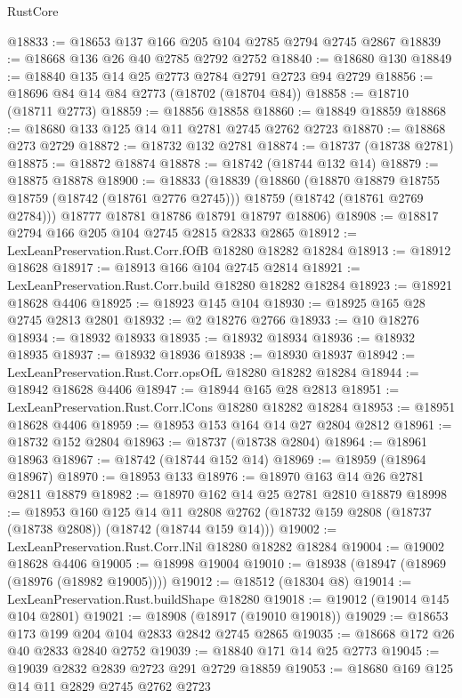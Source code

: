 \begin{lexlean}{RustCore}
\begin{coremodule}
@18833 := @18653 @137 @166 @205 @104 @2785 @2794 @2745 @2867
@18839 := @18668 @136 @26 @40 @2785 @2792 @2752
@18840 := @18680 @130
@18849 := @18840 @135 @14 @25 @2773 @2784 @2791 @2723 @94 @2729
@18856 := @18696 @84 @14 @84 @2773 (@18702 (@18704 @84))
@18858 := @18710 (@18711 @2773)
@18859 := @18856 @18858
@18860 := @18849 @18859
@18868 := @18680 @133 @125 @14 @11 @2781 @2745 @2762 @2723
@18870 := @18868 @273 @2729
@18872 := @18732 @132 @2781
@18874 := @18737 (@18738 @2781)
@18875 := @18872 @18874
@18878 := @18742 (@18744 @132 @14)
@18879 := @18875 @18878
@18900 := @18833
    (@18839
      (@18860
        (@18870 @18879 @18755 @18759 (@18742 (@18761 @2776 @2745)))
        @18759
        (@18742 (@18761 @2769 @2784)))
      @18777
      @18781
      @18786
      @18791
      @18797
      @18806)
@18908 := @18817 @2794 @166 @205 @104 @2745 @2815 @2833 @2865
@18912 := LexLeanPreservation.Rust.Corr.fOfB @18280 @18282 @18284
@18913 := @18912 @18628
@18917 := @18913 @166 @104 @2745 @2814
@18921 := LexLeanPreservation.Rust.Corr.build @18280 @18282 @18284
@18923 := @18921 @18628 @4406
@18925 := @18923 @145 @104
@18930 := @18925 @165 @28 @2745 @2813 @2801
@18932 := @2 @18276 @2766
@18933 := @10 @18276
@18934 := @18932 @18933
@18935 := @18932 @18934
@18936 := @18932 @18935
@18937 := @18932 @18936
@18938 := @18930 @18937
@18942 := LexLeanPreservation.Rust.Corr.opsOfL @18280 @18282 @18284
@18944 := @18942 @18628 @4406
@18947 := @18944 @165 @28 @2813
@18951 := LexLeanPreservation.Rust.Corr.lCons @18280 @18282 @18284
@18953 := @18951 @18628 @4406
@18959 := @18953 @153 @164 @14 @27 @2804 @2812
@18961 := @18732 @152 @2804
@18963 := @18737 (@18738 @2804)
@18964 := @18961 @18963
@18967 := @18742 (@18744 @152 @14)
@18969 := @18959 (@18964 @18967)
@18970 := @18953 @133
@18976 := @18970 @163 @14 @26 @2781 @2811 @18879
@18982 := @18970 @162 @14 @25 @2781 @2810 @18879
@18998 := @18953
    @160
    @125
    @14
    @11
    @2808
    @2762
    (@18732 @159 @2808 (@18737 (@18738 @2808)) (@18742 (@18744 @159 @14)))
@19002 := LexLeanPreservation.Rust.Corr.lNil @18280 @18282 @18284
@19004 := @19002 @18628 @4406
@19005 := @18998 @19004
@19010 := @18938 (@18947 (@18969 (@18976 (@18982 @19005))))
@19012 := @18512 (@18304 @8)
@19014 := LexLeanPreservation.Rust.buildShape @18280
@19018 := @19012 (@19014 @145 @104 @2801)
@19021 := @18908 (@18917 (@19010 @19018))
@19029 := @18653 @173 @199 @204 @104 @2833 @2842 @2745 @2865
@19035 := @18668 @172 @26 @40 @2833 @2840 @2752
@19039 := @18840 @171 @14 @25 @2773
@19045 := @19039 @2832 @2839 @2723 @291 @2729 @18859
@19053 := @18680 @169 @125 @14 @11 @2829 @2745 @2762 @2723

\end{coremodule}
\end{lexlean}
